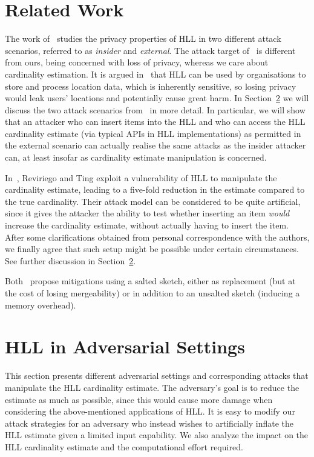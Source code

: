 \documentclass[11pt]{article}
\begin{document}
\section{Related Work}\label{sec:related}

The work of~\cite{cardestprivacy} studies the privacy properties of HLL in two different attack scenarios, referred to as \emph{insider} and \emph{external}. The attack target of~\cite{cardestprivacy} is different from ours, being concerned with loss of privacy, whereas we care about cardinality estimation. It is argued in~\cite{cardestprivacy} that HLL can be used by organisations to store and process location data, which is inherently sensitive, so losing privacy would leak users' locations and potentially cause great harm. In Section~\ref{sec:attacks} we will discuss the two attack scenarios from~\cite{cardestprivacy} in more detail. In particular, we will show that an attacker who can insert items into the HLL and who can access the HLL cardinality estimate (via typical APIs in HLL implementations) as permitted in the external scenario can actually realise the same attacks as the insider attacker can, at least insofar as cardinality estimate manipulation is concerned.

In~\cite{hllvuln}, Reviriego and Ting exploit a vulnerability of HLL to manipulate the cardinality estimate, leading to a five-fold reduction in the estimate compared to the true cardinality. Their attack model can be considered to be quite artificial, since it gives the attacker the ability to test whether inserting an item \emph{would} increase the cardinality estimate, without actually having to insert the item. After some clarifications obtained from personal correspondence with the authors, we finally agree that such setup might be possible under certain circumstances. See further discussion in Section~\ref{sec:attacks}.

Both~\cite{cardestprivacy,hllvuln} propose mitigations using a salted sketch, either as replacement (but at the cost of losing mergeability) or in addition to an unsalted sketch (inducing a memory overhead).

\section{HLL in Adversarial Settings}\label{sec:attacks}

This section presents different adversarial settings and corresponding attacks that manipulate the HLL cardinality estimate. The adversary's goal is to reduce the estimate as much as possible, since this would cause more damage when  considering the above-mentioned applications of HLL. It is easy to modify our attack strategies for an adversary who instead wishes to artificially inflate the HLL estimate given a limited input capability. We also analyze the impact on the HLL cardinality estimate and the computational effort required.
\end{document}

